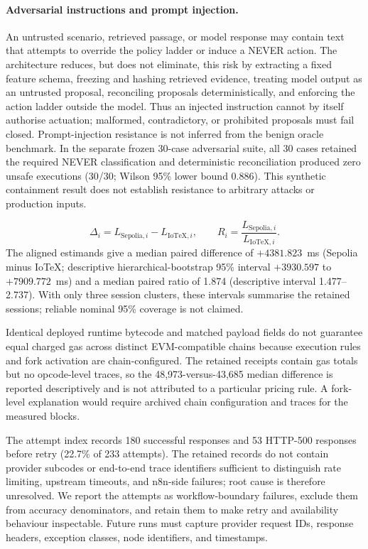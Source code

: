 \paragraph{Adversarial instructions and prompt injection.}
An untrusted scenario, retrieved passage, or model response may contain text
that attempts to override the policy ladder or induce a NEVER action. The
architecture reduces, but does not eliminate, this risk by extracting a fixed
feature schema, freezing and hashing retrieved evidence, treating model output
as an untrusted proposal, reconciling proposals deterministically, and enforcing
the action ladder outside the model. Thus an injected instruction cannot by
itself authorise actuation; malformed, contradictory, or prohibited proposals
must fail closed. Prompt-injection resistance is not inferred from the benign
oracle benchmark. In the separate frozen 30-case adversarial suite, all 30
cases retained the required NEVER classification and deterministic
reconciliation produced zero unsafe executions (30/30; Wilson 95\% lower bound
0.886). This synthetic containment result does not establish resistance to
arbitrary attacks or production inputs.

\begin{equation}
\Delta_i=L_{\mathrm{Sepolia},i}-L_{\mathrm{IoTeX},i},\qquad
R_i=\frac{L_{\mathrm{Sepolia},i}}{L_{\mathrm{IoTeX},i}}.
\end{equation}
The aligned estimands give a median paired difference of
$+4381.823$~ms (Sepolia minus IoTeX; descriptive hierarchical-bootstrap 95\%
interval $+3930.597$ to $+7909.772$~ms) and a median paired ratio of 1.874
(descriptive interval 1.477--2.737). With only three session clusters, these
intervals summarise the retained sessions; reliable nominal 95\% coverage is
not claimed.

Identical deployed runtime bytecode and matched payload fields do not guarantee
equal charged gas across distinct EVM-compatible chains because execution rules
and fork activation are chain-configured. The retained receipts contain gas
totals but no opcode-level traces, so the 48,973-versus-43,685 median difference
is reported descriptively and is not attributed to a particular pricing rule.
A fork-level explanation would require archived chain configuration and traces
for the measured blocks.

The attempt index records 180 successful responses and 53 HTTP-500 responses
before retry (22.7\% of 233 attempts). The retained records do not contain
provider subcodes or end-to-end trace identifiers sufficient to distinguish
rate limiting, upstream timeouts, and n8n-side failures; root cause is therefore
unresolved. We report the attempts as workflow-boundary failures, exclude them
from accuracy denominators, and retain them to make retry and availability
behaviour inspectable. Future runs must capture provider request IDs, response
headers, exception classes, node identifiers, and timestamps.

